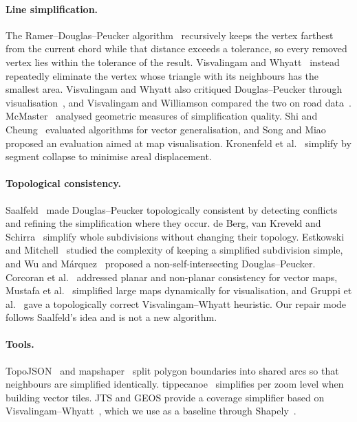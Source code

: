 \documentclass[11pt]{article}
\begin{document}
\paragraph{Line simplification.}
The Ramer--Douglas--Peucker algorithm~\citep{ramer1972,douglas1973} recursively
keeps the vertex farthest from the current chord while that distance exceeds a
tolerance, so every removed vertex lies within the tolerance of the result.
Visvalingam and Whyatt~\citep{visvalingam1993} instead repeatedly eliminate the
vertex whose triangle with its neighbours has the smallest area. Visvalingam and
Whyatt also critiqued Douglas--Peucker through
visualisation~\citep{visvalingam1990}, and Visvalingam and Williamson compared
the two on road data~\citep{visvalingam1995}. McMaster~\citep{mcmaster1986}
analysed geometric measures of simplification quality. Shi and
Cheung~\citep{shi2006} evaluated algorithms for vector generalisation, and Song
and Miao~\citep{song2016} proposed an evaluation aimed at map visualisation.
Kronenfeld et al.~\citep{kronenfeld2020} simplify by segment collapse to
minimise areal displacement.

\paragraph{Topological consistency.}
Saalfeld~\citep{saalfeld1999} made Douglas--Peucker topologically consistent
by detecting conflicts and refining the simplification where they occur. de
Berg, van Kreveld and Schirra~\citep{deberg1998} simplify whole subdivisions
without changing their topology. Estkowski and
Mitchell~\citep{estkowski2001} studied the complexity of keeping a simplified
subdivision simple, and Wu and M\'arquez~\citep{wu2003} proposed a
non-self-intersecting Douglas--Peucker. Corcoran et al.~\citep{corcoran2011}
addressed planar and non-planar consistency for vector maps, Mustafa et
al.~\citep{mustafa2006} simplified large maps dynamically for visualisation,
and Gruppi et al.~\citep{gruppi2015} gave a topologically correct
Visvalingam--Whyatt heuristic. Our repair mode follows Saalfeld's idea and is not
a new algorithm.

\paragraph{Tools.}
TopoJSON~\citep{topojson} and mapshaper~\citep{harrower2006} split polygon
boundaries into shared arcs so that neighbours are simplified identically.
tippecanoe~\citep{tippecanoe} simplifies per zoom level when building vector
tiles. JTS and GEOS provide a coverage simplifier based on
Visvalingam--Whyatt~\citep{jtscoverage}, which we use as a baseline through
Shapely~\citep{shapely}.
\end{document}
